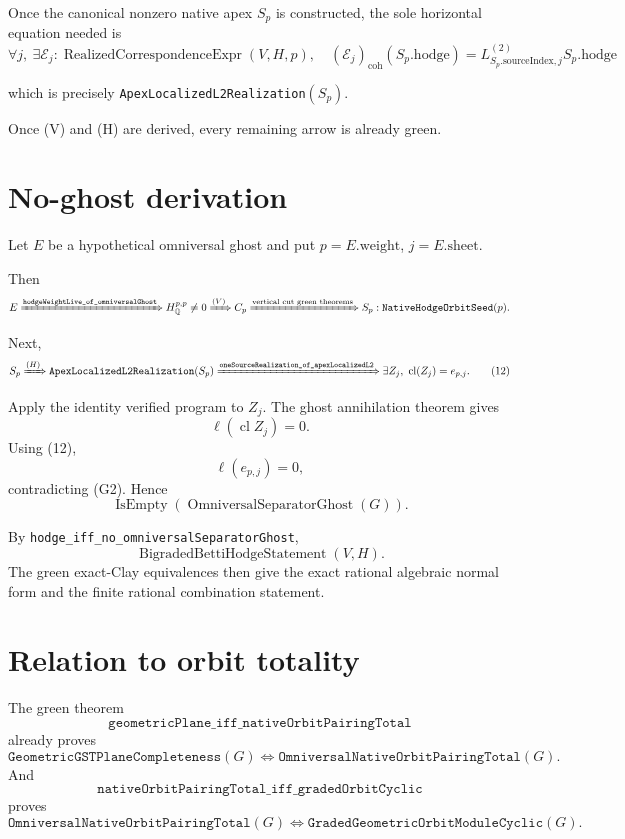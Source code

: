 \documentclass[11pt]{article}
\newcommand{\Q}{\mathbb Q}
\begin{document}
Once the canonical nonzero native apex $S_p$ is constructed, the sole
horizontal equation needed is
\[
 \boxed{
 \forall j,\ \exists\mathcal E_j:
 \operatorname{RealizedCorrespondenceExpr}(V,H,p),\quad
 (\mathcal E_j)_{\mathrm{coh}}(S_p.\mathrm{hodge})
 =
 L^{(2)}_{S_p.\mathrm{sourceIndex},j}S_p.\mathrm{hodge}
 } \tag{H}
\]

which is precisely \texttt{ApexLocalizedL2Realization}$(S_p)$.

Once (V) and (H) are derived, every remaining arrow is already green.

\section{No-ghost derivation}

Let $E$ be a hypothetical omniversal ghost and put
$p=E.\mathrm{weight}$, $j=E.\mathrm{sheet}$.

Then
\[
E
\xRightarrow{\texttt{hodgeWeightLive\_of\_omniversalGhost}}
H^{p,p}_{\Q}\neq0
\xRightarrow{(V)}
C_p
\xRightarrow{\text{vertical cut green theorems}}
S_p:\texttt{NativeHodgeOrbitSeed}(p).
\]

Next,
\[
S_p
\xRightarrow{(H)}
\texttt{ApexLocalizedL2Realization}(S_p)
\xRightarrow{\texttt{oneSourceRealization\_of\_apexLocalizedL2}}
\exists Z_j,\ \operatorname{cl}(Z_j)=e_{p,j}. \tag{12}
\]

Apply the identity verified program to $Z_j$.  The ghost annihilation theorem
gives
\[
 \ell(\operatorname{cl}Z_j)=0.
\]
Using (12),
\[
 \ell(e_{p,j})=0,
\]
contradicting (G2).  Hence
\[
 \operatorname{IsEmpty}(\operatorname{OmniversalSeparatorGhost}(G)).
\]

By \texttt{hodge\_iff\_no\_omniversalSeparatorGhost},
\[
 \boxed{\operatorname{BigradedBettiHodgeStatement}(V,H)}.
\]
The green exact-Clay equivalences then give the exact rational algebraic
normal form and the finite rational combination statement.

\section{Relation to orbit totality}

The green theorem
\[
 \texttt{geometricPlane\_iff\_nativeOrbitPairingTotal}
\]
already proves
\[
 \texttt{GeometricGSTPlaneCompleteness}(G)
 \Longleftrightarrow
 \texttt{OmniversalNativeOrbitPairingTotal}(G). \tag{13}
\]
And
\[
 \texttt{nativeOrbitPairingTotal\_iff\_gradedOrbitCyclic}
\]
proves
\[
 \texttt{OmniversalNativeOrbitPairingTotal}(G)
 \Longleftrightarrow
 \texttt{GradedGeometricOrbitModuleCyclic}(G). \tag{14}
\]
\end{document}
